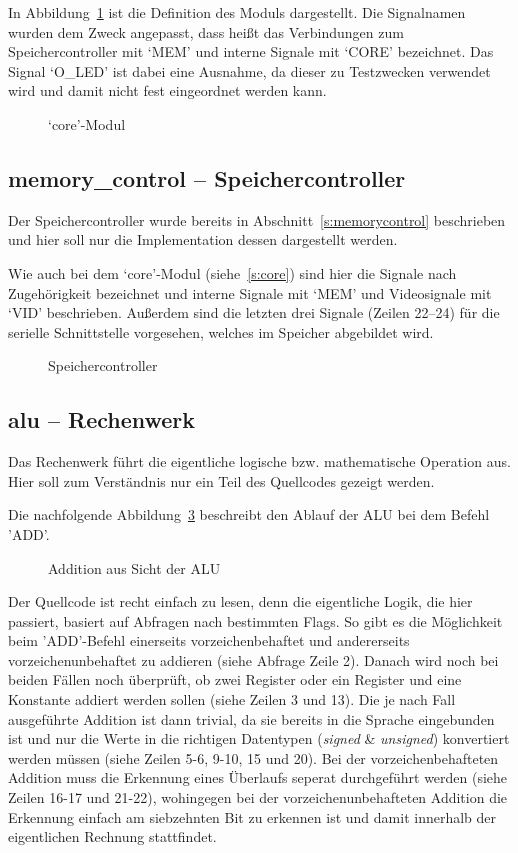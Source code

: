 In Abbildung~\ref{code:core} ist die Definition des Moduls dargestellt. Die
Signalnamen wurden dem Zweck angepasst, dass heißt das Verbindungen zum
Speichercontroller mit `MEM' und interne Signale mit `CORE' bezeichnet. Das
Signal `O\_LED' ist dabei eine Ausnahme, da dieser zu Testzwecken verwendet wird
und damit nicht fest eingeordnet werden kann.
\begin{figure}[htb]

\caption{`core'-Modul}
\label{code:core}
\end{figure}
\pagebreak
\subsection{memory\_control -- Speichercontroller}
\label{s:memcontrol}
Der Speichercontroller wurde bereits in Abschnitt~\ref{s:memorycontrol}
beschrieben und hier soll nur die Implementation dessen dargestellt werden.

Wie auch bei dem `core'-Modul (siehe~\ref{s:core}) sind hier die Signale nach
Zugehörigkeit bezeichnet und interne Signale mit `MEM' und Videosignale mit
`VID' beschrieben. Außerdem sind die letzten drei Signale (Zeilen 22--24) für
die serielle Schnittstelle vorgesehen, welches im Speicher abgebildet wird.
\begin{figure}[htb]

\caption{Speichercontroller}
\label{code:mem_control}
\end{figure}
\pagebreak
\subsection{alu -- Rechenwerk}
Das Rechenwerk führt die eigentliche logische bzw. mathematische Operation aus.
Hier soll zum Verständnis nur ein Teil des Quellcodes gezeigt werden.

Die nachfolgende Abbildung~\ref{code:alu_add} beschreibt den Ablauf der \ac{ALU} bei dem Befehl
'ADD'.

\begin{figure}[htb]

\caption{Addition aus Sicht der ALU}
\label{code:alu_add}
\end{figure}
Der Quellcode ist recht einfach zu lesen, denn die eigentliche Logik, die hier
passiert, basiert auf Abfragen nach bestimmten Flags. So gibt es die Möglichkeit
beim 'ADD'-Befehl einerseits vorzeichenbehaftet und andererseits
vorzeichenunbehaftet zu addieren (siehe Abfrage Zeile 2). Danach wird noch bei
beiden Fällen noch überprüft, ob zwei Register oder ein Register und eine
Konstante addiert werden sollen (siehe Zeilen 3 und 13). Die je nach Fall
ausgeführte Addition ist dann trivial, da sie bereits in die Sprache eingebunden
ist und nur die Werte in die richtigen Datentypen (\textit{signed} \&
\textit{unsigned}) konvertiert werden müssen (siehe Zeilen 5-6, 9-10, 15 und
20).  Bei der vorzeichenbehafteten Addition muss die Erkennung eines Überlaufs
seperat durchgeführt werden (siehe Zeilen 16-17 und 21-22), wohingegen bei der
vorzeichenunbehafteten Addition die Erkennung einfach am siebzehnten Bit zu
erkennen ist und damit innerhalb der eigentlichen Rechnung stattfindet.
